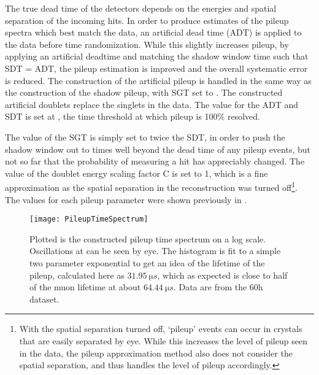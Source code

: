 The true dead time of the detectors depends on the energies and spatial separation of the incoming hits. In order to produce estimates of the pileup spectra which best match the data, an artificial dead time (ADT) is applied to the data before time randomization. While this slightly increases pileup, by applying an artificial deadtime and matching the shadow window time such that SDT = ADT, the pileup estimation is improved and the overall systematic error is reduced. The construction of the artificial pileup is handled in the same way as the construction of the shadow pileup, with SGT set to . The constructed artificial doublets replace the singlets in the data. The value for the ADT and SDT is set at , the time threshold at which pileup is 100\% resolved. 

The value of the SGT is simply set to twice the SDT, in order to push the shadow window out to times well beyond the dead time of any pileup events, but not so far that the probability of measuring a hit has appreciably changed. The value of the doublet energy scaling factor C is set to 1, which is a fine approximation as the spatial separation in the reconstruction was turned off\footnote{With the spatial separation turned off, `pileup' events can occur in crystals that are easily separated by eye. While this increases the level of pileup seen in the data, the pileup approximation method also does not consider the spatial separation, and thus handles the level of pileup accordingly.}. The values for each pileup parameter were shown previously in . 


    \begin{figure}
        \centering
        \texttt{[image: PileupTimeSpectrum]}
        \caption[Pileup time spectrum above threshold]{Plotted is the constructed pileup time spectrum on a log scale. Oscillations at \wa can be seen by eye. The histogram is fit to a simple two parameter exponential to get an idea of the lifetime of the pileup, calculated here as $\SI{31.95}{\micro s}$, which as expected is close to half of the muon lifetime at about $\SI{64.44}{\micro s}$. Data are from the 60h dataset.}
        \label{fig:PileupTimeSpectrum}
    \end{figure}


